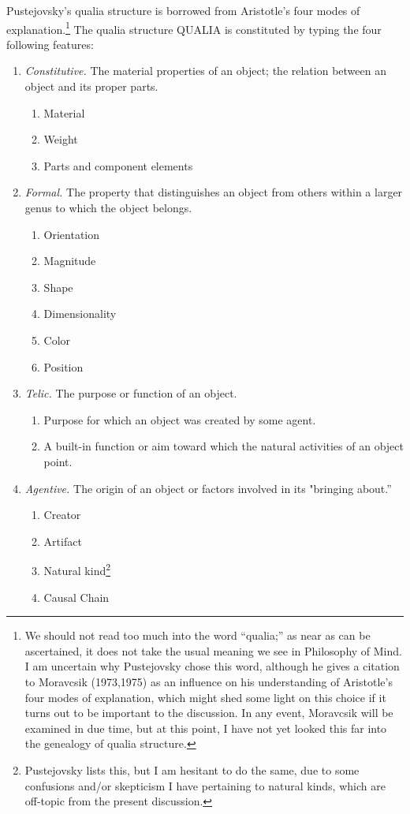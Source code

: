 \documentclass[12pt]{amsart}
\begin{document}
Pustejovsky's qualia structure is borrowed from Aristotle's four modes of explanation.\footnote{We should not read too much into the word ``qualia;'' as near as can be ascertained, it does not take the usual meaning we see in Philosophy of Mind. I am uncertain why Pustejovsky chose this word, although he gives a citation to Moravcsik (1973,1975) as an influence on his understanding of Aristotle's four modes of explanation, which might shed some light on this choice if it turns out to be important to the discussion. In any event, Moravcsik will be examined in due time, but at this point, I have not yet looked this far into the genealogy of qualia structure.} The qualia structure QUALIA is constituted by typing the four following features:
\begin{enumerate}
\item \emph{Constitutive.} The material properties of an object; the relation between an object and its  proper parts.
	\begin{enumerate}
	\item Material
	\item Weight
	\item Parts and component elements
	\end{enumerate}
\item \emph{Formal.} The property that distinguishes an object from others within a larger genus to which the object belongs.
	\begin{enumerate}
	\item Orientation
	\item Magnitude
	\item Shape
	\item Dimensionality
	\item Color
	\item Position
	\end{enumerate}
\item \emph{Telic.} The purpose or function of an object.
	\begin{enumerate}
	\item Purpose for which an object was created by some agent.
	\item A built-in function or aim toward which the natural activities of an object point.
	\end{enumerate}
\item \emph{Agentive.} The origin of an object or factors involved in its "bringing about.''
	\begin{enumerate}
	\item Creator
	\item Artifact
	\item Natural kind\footnote{Pustejovsky lists this, but I am hesitant to do the same, due to some confusions and/or skepticism I have pertaining to natural kinds, which are off-topic from the present discussion.}
	\item Causal Chain
	\end{enumerate}
\end{enumerate}
\end{document}
